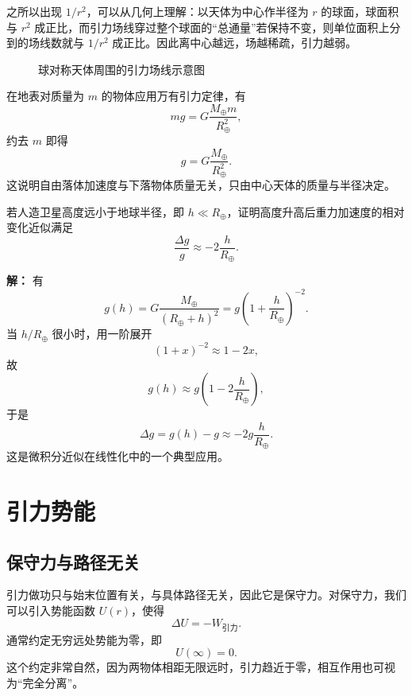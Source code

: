 之所以出现 $1/r^2$，可以从几何上理解：以天体为中心作半径为 $r$ 的球面，球面积与 $r^2$ 成正比，而引力场线穿过整个球面的“总通量”若保持不变，则单位面积上分到的场线数就与 $1/r^2$ 成正比。因此离中心越远，场越稀疏，引力越弱。

\begin{figure}[H]
\centering
{}
\caption{球对称天体周围的引力场线示意图}
\end{figure}

在地表对质量为 $m$ 的物体应用万有引力定律，有
\[
mg=G\frac{M_\oplus m}{R_\oplus^2},
\]
约去 $m$ 即得
\[
g=G\frac{M_\oplus}{R_\oplus^2}.
\]
这说明自由落体加速度与下落物体质量无关，只由中心天体的质量与半径决定。

\begin{example}
若人造卫星高度远小于地球半径，即 $h\ll R_\oplus$，证明高度升高后重力加速度的相对变化近似满足
\[
\frac{\Delta g}{g}\approx -2\frac{h}{R_\oplus}.
\]

\textbf{解：} 有
\[
g(h)=G\frac{M_\oplus}{(R_\oplus+h)^2}=g\left(1+\frac{h}{R_\oplus}\right)^{-2}.
\]
当 $h/R_\oplus$ 很小时，用一阶展开
\[
\left(1+x\right)^{-2}\approx 1-2x,
\]
故
\[
g(h)\approx g\left(1-2\frac{h}{R_\oplus}\right),
\]
于是
\[
\Delta g=g(h)-g\approx -2g\frac{h}{R_\oplus}.
\]
这是微积分近似在线性化中的一个典型应用。
\end{example}

\section{引力势能}

\subsection{保守力与路径无关}

引力做功只与始末位置有关，与具体路径无关，因此它是保守力。对保守力，我们可以引入势能函数 $U(r)$，使得
\[
\Delta U=-W_{\text{引力}}.
\]
通常约定无穷远处势能为零，即
\[
U(\infty)=0.
\]
这个约定非常自然，因为两物体相距无限远时，引力趋近于零，相互作用也可视为“完全分离”。

